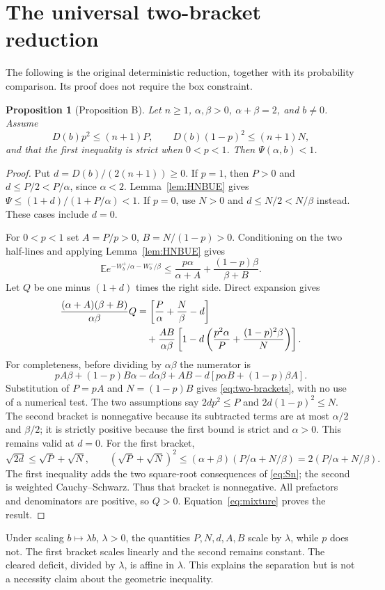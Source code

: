 \documentclass[11pt]{article}
\newtheorem{proposition}[theorem]{Proposition}
\theoremstyle{remark}\newtheorem{remark}[theorem]{Remark}
\newcommand{\E}{\mathbb E}
\numberwithin{equation}{section}
\begin{document}
\section{The universal two-bracket reduction}
The following is the original deterministic reduction, together with
its probability comparison. Its proof does not require the box constraint.
\begin{proposition}[Proposition B]\label{prop:B}
Let $n\ge1$, $\alpha,\beta>0$, $\alpha+\beta=2$, and $b\ne0$.
Assume
\begin{equation}\label{eq:Sn}
 D(b)p^2\le(n+1)P,\qquad D(b)(1-p)^2\le(n+1)N,
\end{equation}
and that the first inequality is strict when $0<p<1$.
Then $\Psi(\alpha,b)<1$.
\end{proposition}
\begin{proof}
Put $d=D(b)/(2(n+1))\ge0$. If $p=1$, then $P>0$ and
$d\le P/2<P/\alpha$, since $\alpha<2$. Lemma~\ref{lem:HNBUE} gives
$\Psi\le(1+d)/(1+P/\alpha)<1$. If $p=0$, use $N>0$ and
$d\le N/2<N/\beta$ instead. These cases include $d=0$.

For $0<p<1$ set $A=P/p>0$, $B=N/(1-p)>0$.
Conditioning on the two half-lines and applying Lemma~\ref{lem:HNBUE}
gives
\begin{equation}\label{eq:mixture}
 \E e^{-W_b^+/\alpha-W_b^-/\beta}
 \le \frac{p\alpha}{\alpha+A}+\frac{(1-p)\beta}{\beta+B}.
\end{equation}
Let $Q$ be one minus $(1+d)$ times the right side. Direct expansion gives
\begin{align}\label{eq:two-brackets}
 \frac{(\alpha+A)(\beta+B)}{\alpha\beta}Q
 &=\left[\frac P\alpha+\frac N\beta-d\right]\\
 &\quad+\frac{AB}{\alpha\beta}
 \left[1-d\left(\frac{p^2\alpha}P+
                 \frac{(1-p)^2\beta}N\right)\right].\notag
\end{align}
For completeness, before dividing by $\alpha\beta$ the numerator is
\[
 pA\beta+(1-p)B\alpha-d\alpha\beta
 +AB-d[p\alpha B+(1-p)\beta A].
\]
Substitution of $P=pA$ and $N=(1-p)B$ gives
\eqref{eq:two-brackets}, with no use of a numerical test.
The two assumptions say $2dp^2\le P$ and $2d(1-p)^2\le N$.
The second bracket is nonnegative because its subtracted terms are
at most $\alpha/2$ and $\beta/2$; it is strictly positive because the
first bound is strict and $\alpha>0$. This remains valid at $d=0$.
For the first bracket,
\[
 \sqrt{2d}\le\sqrt P+\sqrt N,\qquad
 (\sqrt P+\sqrt N)^2
 \le(\alpha+\beta)(P/\alpha+N/\beta)
 =2(P/\alpha+N/\beta).
\]
The first inequality adds the two square-root consequences of
\eqref{eq:Sn}; the second is weighted Cauchy--Schwarz.
Thus that bracket is nonnegative. All prefactors and denominators are
positive, so $Q>0$. Equation~\eqref{eq:mixture} proves the result.
\end{proof}
Under scaling $b\mapsto\lambda b$, $\lambda>0$, the quantities
$P,N,d,A,B$ scale by $\lambda$, while $p$ does not. The first bracket
scales linearly and the second remains constant. The cleared deficit,
divided by $\lambda$, is affine in $\lambda$. This explains the
separation but is not a necessity claim about the geometric inequality.
\end{document}
